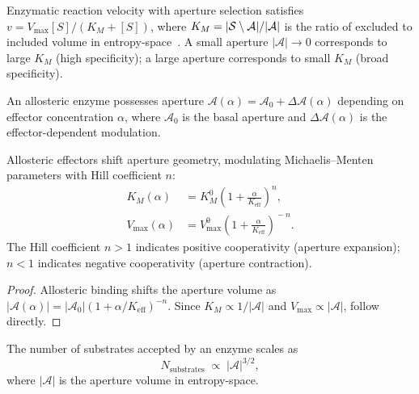 \begin{theorem}
\label{thm:ch03-mm-aperture}
Enzymatic reaction velocity with aperture selection satisfies
$v = V_\mathrm{max}[S]/(K_M+[S])$, where $K_M = |\mathcal{S}\setminus\mathcal{A}|/|\mathcal{A}|$
is the ratio of excluded to included volume in entropy-space~\citep{michaelis1913kinetik}.
A small aperture $|\mathcal{A}|\to 0$ corresponds to large $K_M$ (high
specificity); a large aperture corresponds to small $K_M$ (broad specificity).
\end{theorem}

\begin{definition}
\label{def:ch03-allosteric-aperture}
An allosteric enzyme possesses aperture
$\mathcal{A}(\alpha)=\mathcal{A}_0+\Delta\mathcal{A}(\alpha)$
depending on effector concentration $\alpha$, where $\mathcal{A}_0$ is the
basal aperture and $\Delta\mathcal{A}(\alpha)$ is the effector-dependent
modulation.
\end{definition}

\begin{theorem}
\label{thm:ch03-allosteric}
Allosteric effectors shift aperture geometry, modulating Michaelis--Menten
parameters with Hill coefficient $n$:
\begin{align}
    K_M(\alpha) &= K_M^0\!\left(1+\frac{\alpha}{K_\mathrm{eff}}\right)^{\!n},
    \label{eq:ch03-KM-alpha}\\
    V_\mathrm{max}(\alpha) &= V_\mathrm{max}^0\!\left(1+\frac{\alpha}{K_\mathrm{eff}}\right)^{\!-n}.
    \label{eq:ch03-Vmax-alpha}
\end{align}
The Hill coefficient $n>1$ indicates positive cooperativity (aperture
expansion); $n<1$ indicates negative cooperativity (aperture contraction).
\end{theorem}

\begin{proof}
Allosteric binding shifts the aperture volume as
$|\mathcal{A}(\alpha)|=|\mathcal{A}_0|(1+\alpha/K_\mathrm{eff})^{-n}$.
Since $K_M\propto 1/|\mathcal{A}|$ and $V_\mathrm{max}\propto|\mathcal{A}|$,
 follow directly.
\end{proof}

\begin{proposition}
\label{prop:ch03-promiscuity}
The number of substrates accepted by an enzyme scales as
\begin{equation}
    N_\mathrm{substrates} \;\propto\; |\mathcal{A}|^{3/2},
    \label{eq:ch03-promiscuity}
\end{equation}
where $|\mathcal{A}|$ is the aperture volume in entropy-space.
\end{proposition}


